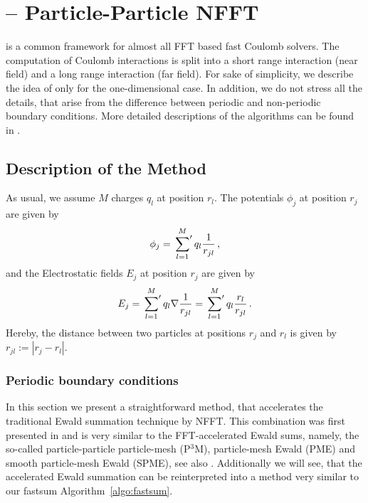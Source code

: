\chapter{\ptwonfftcap -- Particle-Particle NFFT}
\label{cha:p2nfft}

\solvertoindex{\ptwonfft}

\def\alp{13}




\ptwonfft is a common framework for almost all FFT based fast Coulomb solvers.
The computation of Coulomb interactions is split into a short range interaction (near field) and
a long range interaction (far field).
For sake of simplicity, we describe the idea of \ptwonfft only for the one-dimensional case.
In addition, we do not stress all the details, that arise from the difference between periodic and
non-periodic boundary conditions. More detailed descriptions of the algorithms can be found in \cite{PiPo10}.

\section{Description of the Method}

As usual, we assume $M$ charges $q_l$ at position $r_l$. The potentials $\phi_j$ at position $r_j$
are given by
\begin{equation*}
  \phi_j
  =
  \sideset{}{^\prime}\sum_{l=1}^M
    q_l\frac{1}{r_{jl}}
  \,,
\end{equation*}
and the Electrostatic fields $E_j$ at position $r_j$ are given by
\begin{equation*}
  E_j
  =
  \sideset{}{^\prime}\sum_{l=1}^M
    q_l\nabla\frac{1}{r_{jl}}
  =
  \sideset{}{^\prime}\sum_{l=1}^M
    q_l \frac{r_l}{r_{jl}}
  \,.
\end{equation*}
Hereby, the distance between two particles at positions $r_j$ and $r_l$ is given by $r_{jl}:=|r_j-r_l|$.

\subsection{Periodic boundary conditions}
In this section we present a straightforward method, that accelerates the traditional Ewald
summation technique by NFFT. This combination was first presented in \cite{HeLa06} and
is very similar to the FFT-accelerated Ewald sums, namely, the so-called
particle-particle particle-mesh (P$^3$M), particle-mesh Ewald (PME) and smooth particle-mesh
Ewald (SPME), see also \cite{DeHo98a}.
Additionally we will see, that the accelerated Ewald summation can be reinterpreted
into a method very similar to our fastsum Algorithm~\ref{algo:fastsum}.


